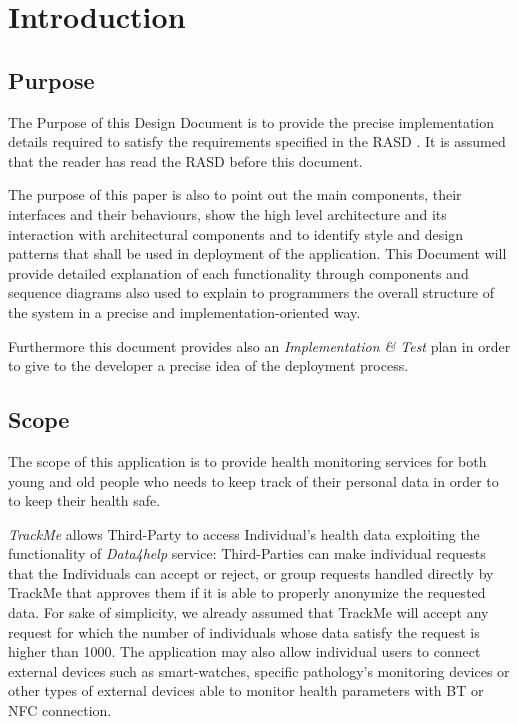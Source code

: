 \documentclass[a4paper]{article}
\begin{document}

\tableofcontents
{}

\newpage
\pagestyle{fancy}

\section{Introduction}
\subsection{Purpose}
    The Purpose of this Design Document is to provide the precise implementation details required to satisfy the requirements specified in the RASD \cite{rasd}.
    It is assumed that the reader has read the RASD before this document.
    
    The purpose of this paper is also to point out the main components, their interfaces and their behaviours, show the high level architecture and its interaction with architectural components and to identify style and design patterns that shall be used in deployment of the application. This Document will provide detailed explanation of each functionality through components and sequence diagrams also used to explain to programmers the overall structure of the system in a precise and implementation-oriented way.
    
    Furthermore this document provides also an \textit{Implementation \& Test} plan in order to give to the developer a precise idea of the deployment process.
 
\subsection{Scope}
    The scope of this application is to provide health monitoring services for both young and old people who needs to keep track of their personal data in order to to keep their health safe.
    
    \textit{TrackMe} allows Third-Party to access Individual's health data exploiting the functionality of \textit{Data4help} service: Third-Parties can make individual requests that the Individuals can accept or reject, or group requests handled directly by TrackMe that approves them if it is able to properly anonymize the requested data. For sake of simplicity, we already assumed that TrackMe will accept any request for which the number of individuals whose data satisfy the request is higher than 1000. The application may also allow individual users to connect external devices such as smart-watches, specific pathology's monitoring devices or other types of external devices able to monitor health parameters with BT or NFC connection.
\end{document}
